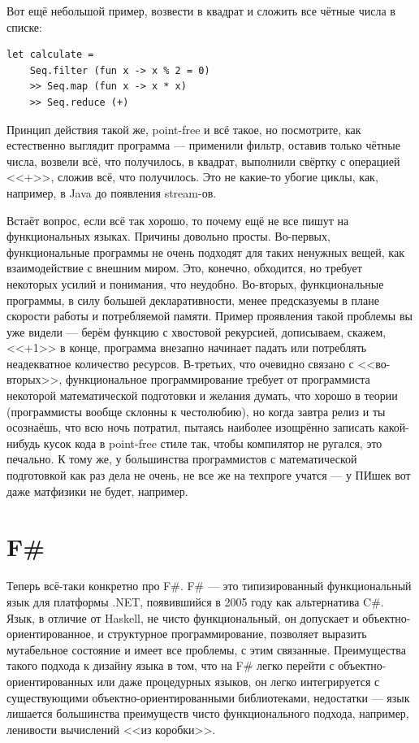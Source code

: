 \documentclass{../../text-style}
\begin{document}
Вот ещё небольшой пример, возвести в квадрат и сложить все чётные числа в списке:

\begin{verbatim}
let calculate = 
    Seq.filter (fun x -> x % 2 = 0) 
    >> Seq.map (fun x -> x * x) 
    >> Seq.reduce (+)
\end{verbatim}

Принцип действия такой же, point-free и всё такое, но посмотрите, как естественно выглядит программа --- применили фильтр, оставив только чётные числа, возвели всё, что получилось, в квадрат, выполнили свёртку с операцией <<+>>, сложив всё, что получилось. Это не какие-то убогие циклы, как, например, в Java до появления stream-ов.

Встаёт вопрос, если всё так хорошо, то почему ещё не все пишут на функциональных языках. Причины довольно просты. Во-первых, функциональные программы не очень подходят для таких ненужных вещей, как взаимодействие с внешним миром. Это, конечно, обходится, но требует некоторых усилий и понимания, что неудобно. Во-вторых, функциональные программы, в силу большей декларативности, менее предсказуемы в плане скорости работы и потребляемой памяти. Пример проявления такой проблемы вы уже видели --- берём функцию с хвостовой рекурсией, дописываем, скажем, <<+1>> в конце, программа внезапно начинает падать или потреблять неадекватное количество ресурсов. В-третьих, что очевидно связано с <<во-вторых>>, функциональное программирование требует от программиста некоторой математической подготовки и желания думать, что хорошо в теории (программисты вообще склонны к честолюбию), но когда завтра релиз и ты осознаёшь, что всю ночь потратил, пытаясь наиболее изощрённо записать какой-нибудь кусок кода в point-free стиле так, чтобы компилятор не ругался, это печально. К тому же, у большинства программистов с математической подготовкой как раз дела не очень, не все же на техпроге учатся --- у ПИшек вот даже матфизики не будет, например.

\section{F\#}

Теперь всё-таки конкретно про F\#. F\# --- это типизированный функциональный язык для платформы .NET, появившийся в 2005 году как альтернатива C\#. Язык, в отличие от Haskell, не чисто функциональный, он допускает и объектно-ориентированное, и структурное программирование, позволяет выразить мутабельное состояние и имеет все проблемы, с этим связанные. Преимущества такого подхода к дизайну языка в том, что на F\# легко перейти с объектно-ориентированных или даже процедурных языков, он легко интегрируется с существующими объектно-ориентированными библиотеками, недостатки --- язык лишается большинства преимуществ чисто функционального подхода, например, ленивости вычислений <<из коробки>>.
\end{document}

